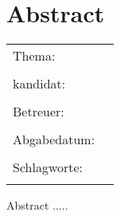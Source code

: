 \chapter*{Abstract}


\begin{center}
	\begingroup
	\renewcommand*{\arraystretch}{1}
	{\makeatletter	
		\begin{tabular}{p{3.2cm}p{9.6cm}}
			Thema: & \thema \\
			& \\
			\type kandidat: & \verfasser \\
			& \\
			Betreuer: & \hoschschule \newline \institut \newline \prueferA \newline \prueferB \\
			& \\
			Abgabedatum: & \abgabedatum \\
			& \\
			Schlagworte: & \schlagworte \\
			& \\
		\end{tabular}
	
	\makeatother}
	\endgroup
\end{center}

\bigskip

\noindent
Abstract .....